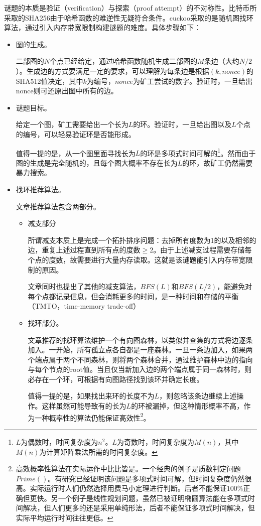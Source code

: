 谜题的本质是验证（verification）与探索（proof attempt）的不对称性。比特币所采取的SHA256由于哈希函数的难逆性无疑符合条件。cuckoo采取的是随机图找环算法，通过引入内存带宽限制构建谜题的难度。具体步骤如下：
\begin{itemize}
	\item 图的生成。
	
	二部图的$N$个点已经给定，通过哈希函数随机生成二部图的$M$条边（大约$N/2$）。生成边的方式要满足一定的要求，可以理解为每条边是根据$(k,nonce)$的SHA512值决定，其中$k$为编号，$nonce$为矿工尝试的数字。验证时，一旦给出nonce则可还原出图中所有的边。
	
	\item 谜题目标。
	
	给定一个图，矿工需要给出一个长为$L$的环。验证时，一旦给出图以及$L$个点的编号，可以轻易验证环是否能形成。
	
	值得一提的是，从一个图里面寻找长为$L$的环是多项式时间可解的\footnote{$L$为偶数时，时间复杂度为$n^2$。$L$为奇数时，时间复杂度为$M(n)$，其中$M(n)$为计算矩阵乘法所需的时间复杂度。}。然而由于图的生成是完全随机的，且每个图大概率不存在长为$L$的环，故矿工仍然需要暴力搜索。
	
	\item 找环推荐算法。
	
    文章推荐算法包含两部分。
    \begin{itemize}
    	\item 减支部分
    	
    	所谓减支本质上是完成一个拓扑排序问题：去掉所有度数为1的以及相邻的边，重复上述过程直到所有点的度数$\geq 2$。由于上述减支过程需要存储每个点的度数，故需要进行大量内存读取。这就是该谜题能引入内存带宽限制的原因。
    	
    	文章同时也提出了其他的减支算法，$BFS(L)$和$BFS(L/2)$，能避免对每个点都记录信息，但会消耗更多的时间，是一种时间和存储的平衡（TMTO，time-memory trade-off）
    	
    	\item 找环部分。
    	
    	文章推荐的找环算法维护一个有向图森林，以类似并查集的方式将边逐条加入。一开始，所有孤立点各自都是一座森林。一旦一条边加入，如果两个端点属于两个不同森林，则将两个森林合并，通过维护森林中边的指向与每个节点的root值。当且仅当新加入边的两个端点属于同一森林时，则必存在一个环，可根据有向图路径找到该环并确定长度。
    	
    	值得一提的是，如果找出来环的长度不为$L$，则忽略该条边继续上述操作。这样虽然可能导致有的长为$L$的环被漏掉，但这种情形概率不高，作为一种概率性的算法仍能保证高效性\footnote{高效概率性算法在实际运作中比比皆是。一个经典的例子是质数判定问题$Prime()$。有研究已经证明该问题是多项式时间可解，但时间复杂度仍然很高。实际运行时人们仍然选择用费马小定理进行判断。后者不能保证$100\%$正确但更快。另一个例子是线性规划问题，虽然已被证明椭圆算法能在多项式时间解决，但人们更多的还是采用单纯形法，后者不能保证多项式时间解决，但实际平均运行时间往往更低。}。
    \end{itemize}
\end{itemize}	

